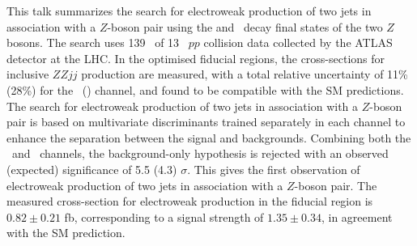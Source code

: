 This talk summarizes the search for electroweak production of two jets in association with a $Z$-boson pair using the \llll and \llvv~decay final states of the two $Z$ bosons. The search uses 139 \ifb~of 13 \TeV~$pp$ collision data collected by the ATLAS detector at the LHC. In the optimised fiducial regions, the cross-sections for inclusive $ZZjj$ production are measured, with a total relative uncertainty of 11\% (28\%) for the \lllljj~(\llvvjj) channel, and found to be compatible with the SM predictions.
The search for electroweak production of two jets in association with a $Z$-boson pair is based on multivariate discriminants trained separately in each channel to enhance the separation between the signal and backgrounds. Combining both the \lllljj~and \llvvjj~channels, the background-only hypothesis is rejected with an observed (expected) significance of 5.5 (4.3) $\sigma$.
This gives the first observation of electroweak production of two jets in association with a $Z$-boson pair.
The measured cross-section for electroweak production in the fiducial region is $0.82\pm0.21$ fb,
corresponding to a signal strength of $1.35\pm0.34$, in agreement with the SM prediction.
